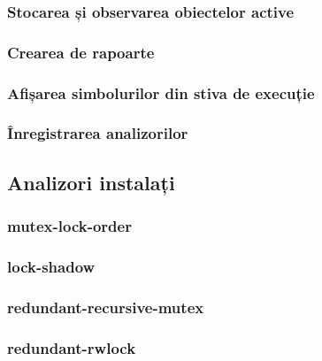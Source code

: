 \subsubsection{Stocarea și observarea obiectelor active}
\subsubsection{Crearea de rapoarte}
\subsubsection{Afișarea simbolurilor din stiva de execuție}
\subsubsection{Înregistrarea analizorilor}
\subsection{Analizori instalați}
\subsubsection{mutex-lock-order}
\subsubsection{lock-shadow}
\subsubsection{redundant-recursive-mutex}
\subsubsection{redundant-rwlock}
